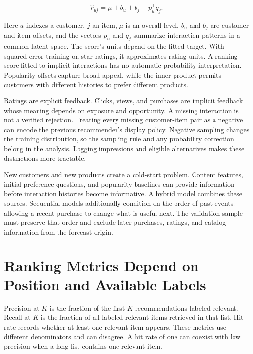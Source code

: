 \[
\hat r_{uj}=\mu+b_u+b_j+p_u^\top q_j.
\]

Here \(u\) indexes a customer, \(j\) an item, \(\mu\) is an overall
level, \(b_u\) and \(b_j\) are customer and item offsets, and the
vectors \(p_u\) and \(q_j\) summarize interaction patterns in a common
latent space. The score's units depend on the fitted target. With
squared-error training on star ratings, it approximates rating units. A
ranking score fitted to implicit interactions has no automatic
probability interpretation. Popularity offsets capture broad appeal,
while the inner product permits customers with different histories to
prefer different products.

Ratings are explicit feedback. Clicks, views, and purchases are implicit
feedback whose meaning depends on exposure and opportunity. A missing
interaction is not a verified rejection. Treating every missing
customer-item pair as a negative can encode the previous recommender's
display policy. Negative sampling changes the training distribution, so
the sampling rule and any probability correction belong in the analysis.
Logging impressions and eligible alternatives makes these distinctions
more tractable.

New customers and new products create a cold-start problem. Content
features, initial preference questions, and popularity baselines can
provide information before interaction histories become informative. A
hybrid model combines these sources. Sequential models additionally
condition on the order of past events, allowing a recent purchase to
change what is useful next. The validation sample must preserve that
order and exclude later purchases, ratings, and catalog information from
the forecast origin.

\hypertarget{M07-ranking-metrics-depend-on-position-and-available-labels}{%
\section{Ranking Metrics Depend on Position and Available
Labels}\label{M07-ranking-metrics-depend-on-position-and-available-labels}}

\noindent Precision at \(K\) is the fraction of the first \(K\) recommendations
labeled relevant. Recall at \(K\) is the fraction of all labeled
relevant items retrieved in that list. Hit rate records whether at least
one relevant item appears. These metrics use different denominators and
can disagree. A hit rate of one can coexist with low precision when a
long list contains one relevant item.

